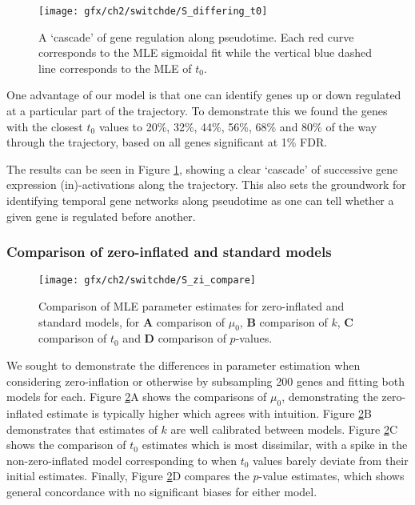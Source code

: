 \begin{figure}[h]%
\centering
\texttt{[image: gfx/ch2/switchde/S\_differing\_t0]}
\caption{A `cascade' of gene regulation along pseudotime. Each red curve corresponds to the MLE sigmoidal fit while the vertical blue dashed line corresponds to the MLE of $t_0$.}\label{fig:S3}
\end{figure}

One advantage of our model is that one can identify genes up or down regulated at a particular part of the trajectory. To demonstrate this we found the genes with the closest $t_0$ values to 20\%, 32\%, 44\%, 56\%, 68\% and 80\% of the way through the trajectory, based on all genes significant at 1\% FDR.

The results can be seen in Figure \ref{fig:S3}, showing a clear `cascade' of successive gene expression (in)-activations along the trajectory. This also sets the groundwork for identifying temporal gene networks along pseudotime as one can tell whether a given gene is regulated before another.


\subsubsection{Comparison of zero-inflated and standard models}

\begin{figure}[!h]%
\centering
\texttt{[image: gfx/ch2/switchde/S\_zi\_compare]}
\caption{Comparison of MLE parameter estimates for zero-inflated and standard models, for \textbf{A} comparison of $\mu_0$, \textbf{B} comparison of $k$, \textbf{C} comparison of $t_0$ and \textbf{D} comparison of $p$-values.}\label{fig:S4}
\end{figure}


We sought to demonstrate the differences in parameter estimation when considering zero-inflation or otherwise by subsampling 200 genes and fitting both models for each. Figure \ref{fig:S4}A shows the comparisons of $\mu_0$, demonstrating the zero-inflated estimate is typically higher which agrees with intuition. Figure \ref{fig:S4}B demonstrates that estimates of $k$ are well calibrated between models. Figure \ref{fig:S4}C shows the comparison of $t_0$ estimates which is most dissimilar, with a spike in the non-zero-inflated model corresponding to when $t_0$ values barely deviate from their initial estimates. Finally, Figure \ref{fig:S4}D compares the $p$-value estimates, which shows general concordance with no significant biases for either model.


